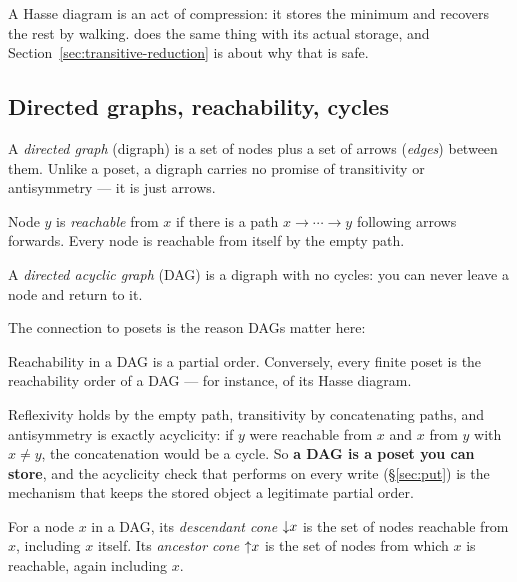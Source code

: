 A Hasse diagram is an act of compression: it stores the minimum and recovers
the rest by walking. \odag{} does the same thing with its actual storage, and
Section~\ref{sec:transitive-reduction} is about why that is safe.

\subsection{Directed graphs, reachability, cycles}

A \emph{directed graph} (digraph) is a set of nodes plus a set of arrows
(\emph{edges}) between them. Unlike a poset, a digraph carries no promise of
transitivity or antisymmetry --- it is just arrows.

\begin{definition}[Reachability]
Node $y$ is \emph{reachable} from $x$ if there is a path
$x \to \cdots \to y$ following arrows forwards. Every node is reachable from
itself by the empty path.
\end{definition}

\begin{definition}[DAG]
A \emph{directed acyclic graph} (DAG) is a digraph with no cycles: you can
never leave a node and return to it.
\end{definition}

The connection to posets is the reason DAGs matter here:

\begin{proposition}
\label{prop:dag-poset}
Reachability in a DAG is a partial order. Conversely, every finite poset is
the reachability order of a DAG --- for instance, of its Hasse diagram.
\end{proposition}

\noindent Reflexivity holds by the empty path, transitivity by concatenating
paths, and antisymmetry is exactly acyclicity: if $y$ were reachable from $x$
and $x$ from $y$ with $x \neq y$, the concatenation would be a cycle. So
\textbf{a DAG is a poset you can store}, and the acyclicity check that
\odag{} performs on every write (\S\ref{sec:put}) is the mechanism that keeps
the stored object a legitimate partial order.

\begin{definition}[Cone]
For a node $x$ in a DAG, its \emph{descendant cone} $\mathord{\downarrow}x$ is the set of
nodes reachable from $x$, including $x$ itself. Its \emph{ancestor cone}
$\mathord{\uparrow}x$ is the set of nodes from which $x$ is reachable, again including $x$.
\end{definition}

